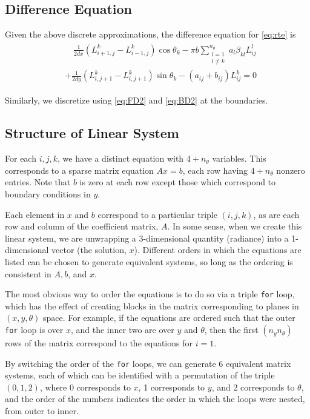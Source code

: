 \documentclass[10pt]{article}
\begin{document}
\begin{multicols}{2}
\subsection{Difference Equation}
Given the above discrete approximations, the difference equation for \eqref{eq:rte} is
\begin{align}
	\label{eq:diffeq}
	\begin{split}
	&\quad\frac{1}{2dx}\left(L_{i+1,j}^k - L_{i-1,j}^k\right) \cos\theta_k 
	- \pi b \sum_{\substack{l=1\\ l\neq k}}^{n_\theta} a_l\beta_{kl}L_{ij}^l \\
	&+ \frac{1}{2dy}\left(L_{i,j+1}^k - L_{i,j+1}^k\right) \sin\theta_k 
	- (a_{ij} + b_{ij})L_{ij}^k
	=0
	\end{split}
\end{align}

Similarly, we discretize using \eqref{eq:FD2} and \eqref{eq:BD2} at the boundaries.

\subsection{Structure of Linear System}
For each $i,j,k$, we have a distinct equation with $4+n_\theta$ variables.
This corresponds to a sparse matrix equation $Ax=b$, each row having $4+n_\theta$ nonzero entries.
Note that $b$ is zero at each row except those which correspond to boundary conditions in $y$.

Each element in $x$ and $b$ correspond to a particular triple $(i,j,k)$, as are each row and column of the coefficient matrix, $A$.
In some sense, when we create this linear system, we are unwrapping a 3-dimensional quantity (radiance) into a 1-dimensional vector (the solution, $x$).
Different orders in which the equations are listed can be chosen to generate equivalent systems, so long as the ordering is consistent in $A,b$, and $x$.

The most obvious way to order the equations is to do so via a triple \texttt{for} loop, which has the effect of creating blocks in the matrix corresponding to planes in $(x,y,\theta)$ space.
For example, if the equations are ordered such that the outer \texttt{for} loop is over $x$, and the inner two are over $y$ and $\theta$, then the first $(n_y n_\theta)$ rows of the matrix correspond to the equations for $i=1$.

By switching the order of the \texttt{for} loops, we can generate 6 equivalent matrix systems, each of which can be identified with a permutation of the triple $(0,1,2)$, where 0 corresponds to $x$, 1 corresponds to $y$, and 2 corresponds to $\theta$, and the order of the numbers indicates the order in which the loops were nested, from outer to inner.




\end{multicols}
\end{document}
